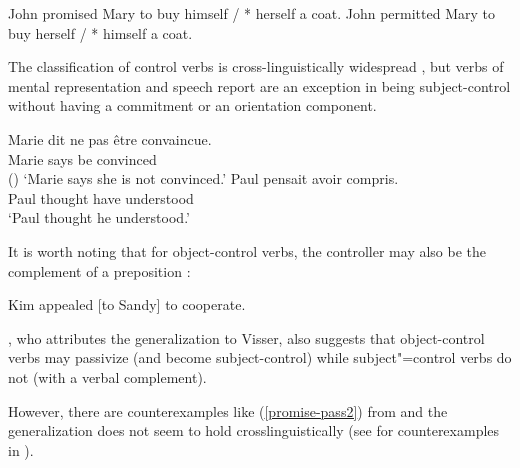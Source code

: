 \eal
\ex\label{ex-John-promised-Mary-to-buy}
John promised Mary to buy himself / * herself a coat. \label{commit}
\ex\label{ex-John-permitted-Mary-to-buy} 
John permitted Mary to buy herself / * himself a coat.\label{orient}
\zl
 
  The classification of control verbs is cross-linguistically widespread \citep{VanValinandLapolla1997}, but  verbs of mental representation and speech report are an exception in being subject-control without having a commitment or an orientation component.


\begin{exe}
\ex \begin{xlist}
\ex 
\gll Marie dit {ne pas} \^etre convaincue.\\
     Marie says  be convinced \\\hfill()
\glt `Marie says she is not convinced.'	
\ex 
\gll Paul pensait  avoir compris. \\
     Paul thought have understood \\
\glt `Paul thought he understood.'
 \end{xlist}
\end{exe}

It is worth noting that for object-control verbs, the controller may also be the complement of a preposition \citep[]{PollardandSag1994}:

\begin{exe}
\ex Kim appealed [to Sandy] to cooperate. \label{to}
\end{exe}


 
\citet[]{Bresnan1982}, who attributes the generalization to Visser, also suggests that
object-control verbs may passivize (and become subject-control) while subject"=control verbs do not
(with a verbal complement). 

\eal
{}\label{persuade-pass}
\label{promise-pass}
\label{promise-pass2}
\zl
However, there are counterexamples like (\ref{promise-pass2}) from \citet{JB1976a-u}\addpages and the generalization does not seem to
hold crosslinguistically (see  for counterexamples in ). 
 
